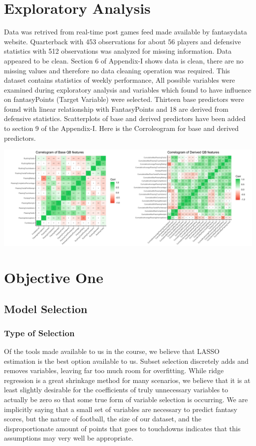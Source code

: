\documentclass[american,]{article}
\begin{document}
\section{Exploratory Analysis}\label{exploratory-analysis}

Data was retrived from real-time post games feed made available by fantasydata website. Quarterback with 453 observations for about 56 players and defensive statistics with 512 observations was analyzed for missing information. Data appeared to be clean. Section 6 of Appendix-I shows data is clean, there are no missing values and therefore no data cleaning operation was required. This dataset contains statistics of weekly performance, All possible variables were examined during exploratory analysis and variables which found to have influence on fantasyPoints (Target Variable) were selected. Thirteen base predictors were found with linear relationship with FantasyPoints and 18 are derived from defensive statistics. Scatterplots of base and derived predictors have been added to section 9 of the Appendix-I. Here is the Corroleogram for base and derived predictors. 


\graphicspath{ {images/} }
\includegraphics{img001.png}


\section{Objective One}\label{objective-one}

\subsection{Model Selection}\label{model-selection}

\subsubsection{Type of Selection}\label{type-of-selection}

Of the tools made available to us in the course, we believe that LASSO
estimation is the best option available to us. Subset selection
discretely adds and removes variables, leaving far too much room for
overfitting. While ridge regression is a great shrinkage method for many
scenarios, we believe that it is at least slightly desirable for the
coefficients of truly unnecessary variables to actually be zero so that
some true form of variable selection is occurring. We are implicitly
saying that a small set of variables are necessary to predict fantasy
scores, but the nature of football, the size of our dataset, and the
disproportionate amount of points that goes to touchdowns indicates that
this assumptions may very well be appropriate.
\end{document}
